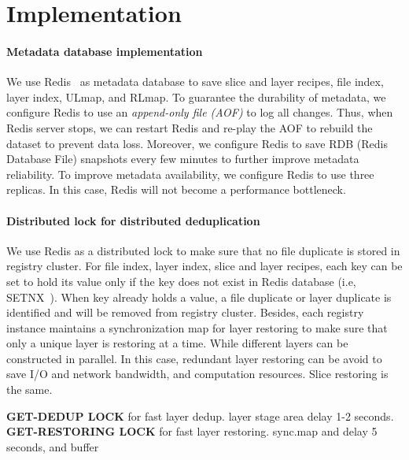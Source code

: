 \section{Implementation}
\label{sec:impl}

\paragraph{Metadata database implementation}
We use Redis~\cite{xxx} as metadata database to save slice and layer recipes, file index, layer index, ULmap, and RLmap.
To guarantee the durability of metadata, 
we configure Redis to use an \emph{append-only file (AOF)} to log all changes.
Thus, when Redis server stops, we can restart Redis and re-play the AOF to rebuild the dataset to prevent data loss.
Moreover, we configure Redis to save RDB (Redis Database File) snapshots every few minutes to further improve metadata reliability. 
To improve metadata availability, 
we configure Redis to use three replicas.
In this case, Redis will not become a performance bottleneck.

\paragraph{Distributed lock for distributed deduplication}
We use Redis as a distributed lock to make sure that no file duplicate is stored in registry cluster.
For file index, layer index, slice and layer recipes, each key can be set to hold its value only if the key does not exist in Redis database (i.e, SETNX~\cite{xxx}).
When key already holds a value, a file duplicate or layer duplicate is identified and will be removed from registry cluster.
 Besides, 
 each registry instance maintains a  synchronization map for layer restoring to make sure that only a unique layer is restoring at a time.
 While different layers can be constructed in parallel. 
 In this case, redundant layer restoring can be avoid to save I/O and network bandwidth, and computation resources.
 Slice restoring is the same.
 
 \textbf{GET-DEDUP LOCK} for fast layer dedup.
 layer stage area delay 1-2 seconds.
 \textbf{GET-RESTORING LOCK} for fast layer restoring.
 sync.map and delay 5 seconds, and buffer

